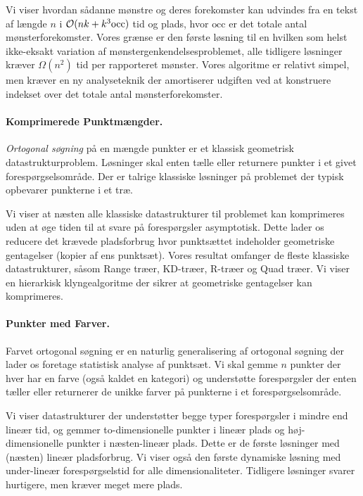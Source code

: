 Vi viser hvordan sådanne mønstre og deres forekomster kan udvindes fra en tekst af længde $n$ i $\mathcal{O}(nk + k^3 \textrm{occ})$ tid og plads, hvor $\textrm{occ}$ er det totale antal mønsterforekomster.
Vores grænse er den første løsning til en hvilken som helst ikke-eksakt variation af mønstergenkendelsesproblemet, alle tidligere løsninger kræver $\Omega(n^2)$ tid per rapporteret mønster. 
Vores algoritme er relativt simpel, men kræver en ny analyseteknik der amortiserer udgiften ved at konstruere indekset over det totale antal mønsterforekomster.


\paragraph{Komprimerede Punktmængder.}
\emph{Ortogonal søgning} på en mængde punkter er et klassisk geometrisk datastrukturproblem. Løsninger skal enten tælle eller returnere punkter i et givet forespørgselsområde. Der er talrige klassiske løsninger på problemet der typisk opbevarer punkterne i et træ.

Vi viser at næsten alle klassiske datastrukturer til problemet kan komprimeres uden at øge tiden til at svare på forespørgsler asymptotisk. Dette lader os reducere det krævede pladsforbrug hvor punktsættet indeholder geometriske gentagelser (kopier af ens punktsæt).
Vores resultat omfanger de fleste klassiske datastrukturer, såsom Range træer, KD-træer, R-træer og Quad træer. Vi viser en hierarkisk klyngealgoritme der sikrer at geometriske gentagelser kan komprimeres.


\paragraph{Punkter med Farver.}
Farvet ortogonal søgning er en naturlig generalisering af ortogonal søgning der lader os foretage statistisk analyse af punktsæt. Vi skal gemme $n$ punkter der hver har en farve (også kaldet en kategori) og understøtte forespørgsler der enten tæller eller returnerer de unikke farver på punkterne i et forespørgselsområde.

Vi viser datastrukturer der understøtter begge typer forespørgsler i mindre end lineær tid, og gemmer to-dimensionelle punkter i lineær plads og høj-dimensionelle punkter i næsten-lineær plads. Dette er de første løsninger med (næsten) lineær pladsforbrug. Vi viser også den første dynamiske løsning med under-lineær forespørgselstid for alle dimensionaliteter. Tidligere løsninger svarer hurtigere, men kræver meget mere plads.


